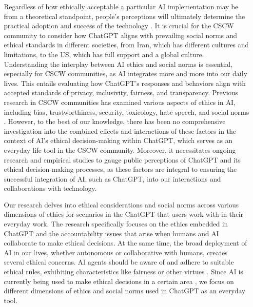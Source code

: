 \documentclass[sigconf]{acmart}
\begin{document}
Regardless of how ethically acceptable a particular AI implementation may be from a theoretical standpoint, people's perceptions will ultimately determine the practical adoption and success of the technology \cite{tolmeijer2022capable}. It is crucial for the CSCW community to consider how ChatGPT aligns with prevailing social norms and ethical standards in different societies, from Iran, which has different cultures and limitations, to the US, which has full support and a global culture. Understanding the interplay between AI ethics and social norms is essential, especially for CSCW communities, as AI integrates more and more into our daily lives. This entails evaluating how ChatGPT's responses and behaviors align with accepted standards of privacy, inclusivity, fairness, and transparency. Previous research in CSCW communities has examined various aspects of ethics in AI, including bias, trustworthiness, security, toxicology, hate speech, and social norms \cite{li2022ethical,yi2003privacy, 10.1145/3462204.3481729,vitak2016beyond}. However, to the best of our knowledge, there has been no comprehensive investigation into the combined effects and interactions of these factors in the context of AI's ethical decision-making within ChatGPT, which serves as an everyday life tool in the CSCW community. Moreover, it necessitates ongoing research and empirical studies to gauge public perceptions of ChatGPT and its ethical decision-making processes, as these factors are integral to ensuring the successful integration of AI, such as ChatGPT, into our interactions and collaborations with technology.

Our research delves into ethical considerations and social norms across various dimensions of ethics for scenarios in the ChatGPT that users work with in their everyday work. The research specifically focuses on the ethics embedded in ChatGPT and the accountability issues that arise when humans and AI collaborate to make ethical decisions. At the same time, the broad deployment of AI in our lives, whether autonomous or collaborative with humans, creates several ethical concerns. AI agents should be aware of and adhere to suitable ethical rules, exhibiting characteristics like fairness or other virtues \cite{rossi2019building}. Since AI is currently being used to make ethical decisions in a certain area \cite{Hallamaa2022AI, evans2023chatgpt}, we focus on different dimensions of ethics and social norms used in ChatGPT as an everyday tool.
\end{document}
